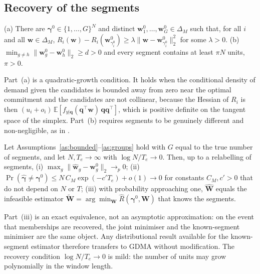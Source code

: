 \subsection{Recovery of the segments}

\begin{assumption}\label{as:groups}
(a) There are $\bm\gamma^0\in\{1,\dots,G\}^N$ and distinct $\bm w^0_1,\dots,\bm w^0_G\in\Delta_M$ such that, for all $i$ and all $\bm w\in\Delta_M$, $R_i(\bm w)-R_i(\bm w^0_{\gamma^0_i})\ge\lambda\|\bm w-\bm w^0_{\gamma^0_i}\|_2^2$ for some $\lambda>0$.
(b) $\min_{g\ne h}\|\bm w^0_g-\bm w^0_h\|_2\ge d>0$ and every segment contains at least $\pi N$ units, $\pi>0$.
\end{assumption}

Part~(a) is a quadratic-growth condition.
It holds when the conditional density of demand given the candidates is bounded away from zero near the optimal commitment and the candidates are not collinear, because the Hessian of $R_i$ is then $(u_i+o_i)\,\mathbb E[f_{y|\bm q}(\bm q^\top\bm w)\,\bm q\bm q^\top]$, which is positive definite on the tangent space of the simplex.
Part~(b) requires segments to be genuinely different and non-negligible, as in \citet{BonhommeManresa2015}.

\begin{theorem}\label{thm:recovery}
Let Assumptions~\ref{as:bounded}--\ref{as:groups} hold with $G$ equal to the true number of segments, and let $N,T_e\to\infty$ with $\log N/T_e\to0$.
Then, up to a relabelling of segments,
(i) $\max_g\|\widehat{\bm w}_g-\bm w^0_g\|_2\to_p0$;
(ii) $\Pr(\widehat{\bm\gamma}\ne\bm\gamma^0)\le N\,C_M\exp(-c'T_e)+o(1)\to0$ for constants $C_M,c'>0$ that do not depend on $N$ or $T$;
(iii) with probability approaching one, $\widehat{\bm W}$ equals the infeasible estimator $\widetilde{\bm W}=\arg\min_{\bm W}\widehat R(\bm\gamma^0,\bm W)$ that knows the segments.
\end{theorem}

Part~(iii) is an exact equivalence, not an asymptotic approximation: on the event that memberships are recovered, the joint minimiser and the known-segment minimiser are the same object.
Any distributional result available for the known-segment estimator therefore transfers to GDMA without modification.
The recovery condition $\log N/T_e\to0$ is mild: the number of units may grow polynomially in the window length.

